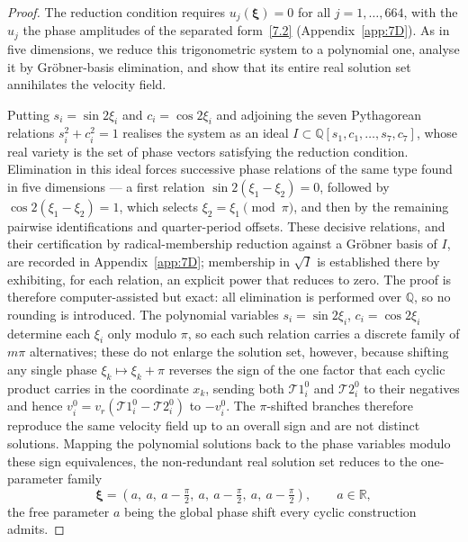 \documentclass[11pt]{jfm}
\numberwithin{equation}{section}
\begin{document}
\begin{proof}
The reduction condition requires $u_j(\boldsymbol{\xi})=0$ for all $j=1,\ldots,664$, with the
$u_j$ the phase amplitudes of the separated form~\eqref{7.2} (Appendix~\ref{app:7D}). As in five
dimensions, we reduce this trigonometric system to a polynomial one, analyse it by Gr\"obner-basis
elimination, and show that its entire real solution set annihilates the velocity field.

Putting $s_i=\sin 2\xi_i$ and $c_i=\cos 2\xi_i$ and adjoining the seven Pythagorean relations
$s_i^2+c_i^2=1$ realises the system as an ideal
$I\subset\mathbb{Q}[s_1,c_1,\ldots,s_7,c_7]$, whose real variety is the set of phase vectors
satisfying the reduction condition. Elimination in this ideal forces successive phase relations of the same
type found in five dimensions --- a first relation $\sin 2(\xi_1-\xi_2)=0$, followed by
$\cos 2(\xi_1-\xi_2)=1$, which selects $\xi_2=\xi_1\pmod{\pi}$, and then by the remaining
pairwise identifications and quarter-period offsets. These
decisive relations, and their certification by radical-membership reduction against a Gr\"obner
basis of $I$, are recorded in Appendix~\ref{app:7D}; membership in $\sqrt{I}$ is established there
by exhibiting, for each relation, an explicit power that reduces to zero. The proof is therefore
computer-assisted but exact: all elimination is performed over $\mathbb{Q}$, so no rounding is
introduced. The
polynomial variables $s_i=\sin2\xi_i$, $c_i=\cos2\xi_i$ determine each $\xi_i$ only modulo $\pi$,
so each such relation carries a discrete family of $m\pi$ alternatives; these do not enlarge the
solution set, however, because shifting any single phase $\xi_k\mapsto\xi_k+\pi$ reverses the sign
of the one factor that each cyclic product carries in the coordinate $x_k$, sending both
$\mathcal{T}1_i^0$ and $\mathcal{T}2_i^0$ to their negatives and hence
$v_i^0=v_r(\mathcal{T}1_i^0-\mathcal{T}2_i^0)$ to $-v_i^0$. The $\pi$-shifted branches therefore
reproduce the same velocity field up to an overall sign and are not distinct solutions. Mapping
the polynomial solutions back to the phase variables modulo these sign equivalences, the
non-redundant real solution set reduces to the one-parameter family
\begin{equation}
\label{7.5}
\boldsymbol{\xi} = \left(a,\ a,\ a-\tfrac{\pi}{2},\ a,\ a-\tfrac{\pi}{2},\ a,\ a-\tfrac{\pi}{2}\right),
\qquad a\in\mathbb{R},
\end{equation}
the free parameter $a$ being the global phase shift every cyclic construction admits.


\end{proof}
\end{document}
